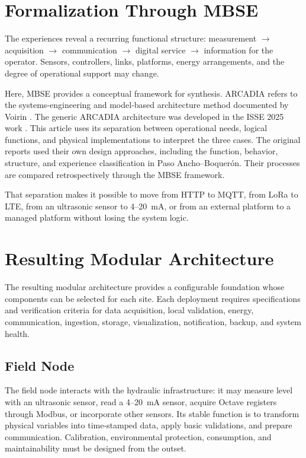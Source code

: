 \documentclass[conference]{IEEEtran}
\begin{document}
\section{Formalization Through MBSE}

The experiences reveal a recurring functional structure: measurement $\rightarrow$ acquisition $\rightarrow$ communication $\rightarrow$ digital service $\rightarrow$ information for the operator. Sensors, controllers, links, platforms, energy arrangements, and the degree of operational support may change.

Here, MBSE provides a conceptual framework for synthesis. ARCADIA refers to the systems-engineering and model-based architecture method documented by Voirin \cite{voirin2018arcadia}. The generic ARCADIA architecture was developed in the ISSE 2025 work \cite{arguedas2025towards}. This article uses its separation between operational needs, logical functions, and physical implementations to interpret the three cases. The original reports used their own design approaches, including the function, behavior, structure, and experience classification in Paso Ancho--Boquer\'{o}n. Their processes are compared retrospectively through the MBSE framework.

That separation makes it possible to move from HTTP to MQTT, from LoRa to LTE, from an ultrasonic sensor to 4--20~mA, or from an external platform to a managed platform without losing the system logic.

\section{Resulting Modular Architecture}

The resulting modular architecture provides a configurable foundation whose components can be selected for each site. Each deployment requires specifications and verification criteria for data acquisition, local validation, energy, communication, ingestion, storage, visualization, notification, backup, and system health.

\subsection{Field Node}

The field node interacts with the hydraulic infrastructure: it may measure level with an ultrasonic sensor, read a 4--20~mA sensor, acquire Octave registers through Modbus, or incorporate other sensors. Its stable function is to transform physical variables into time-stamped data, apply basic validations, and prepare communication. Calibration, environmental protection, consumption, and maintainability must be designed from the outset.
\end{document}
